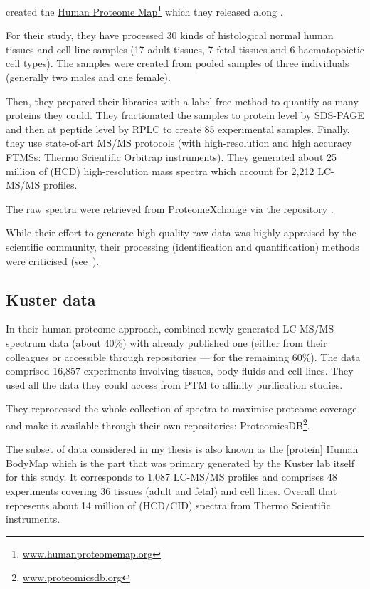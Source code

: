 \cite{PandeyData} created the \href{http://www.humanproteomemap.org/}%
{Human Proteome Map}\footnote{%
\href{http://www.humanproteomemap.org/}{www.humanproteomemap.org}} which
they released along .

For their study, they have processed 30 kinds of histological normal human
tissues and cell line samples (17 adult tissues, 7 fetal tissues and 6
haematopoietic cell types). The samples were created from pooled samples of three
individuals (generally two males and one female).

Then, they prepared their libraries with a label-free method to quantify
as many proteins they could. They fractionated the samples to protein level by
\gls{SDS-PAGE} and then at peptide level by \gls{RPLC} to create 85 experimental
samples. Finally, they use state-of-art \gls{MS/MS} protocols
(with high-resolution and high accuracy \glspl{FTMS}:
Thermo Scientific Orbitrap instruments).
They generated about 25 million of (\gls{HCD})
high-resolution mass spectra which account for 2,212 \gls{LC-MS/MS} profiles.

The raw spectra were retrieved from ProteomeXchange via the repository
.

While their effort to generate high quality raw data was highly appraised
by the scientific community, their processing
(identification and quantification) methods were
criticised (see~\cite{Ezkurdia2014-qx}).

\subsection{Kuster data}

In their human proteome approach,
\cite{KusterData} combined newly generated \gls{LC-MS/MS} spectrum
data (about 40\%) with already published one
(either from their colleagues or accessible through repositories ---
for the remaining 60\%).
The data comprised 16,857 experiments involving tissues, body fluids and cell
lines. They used all the data they could access from \gls{PTM} to affinity
purification studies.

They reprocessed the whole collection of spectra to maximise proteome coverage
and make it available through their own repositories: ProteomicsDB\footnote{%
\href{https://www.proteomicsdb.org/}{www.proteomicsdb.org}}.

The subset of data considered in my thesis is also
known as the [protein] Human BodyMap which is the part that was primary generated
by the Kuster lab itself for this study. It corresponds to 1,087 \gls{LC-MS/MS}
profiles and comprises 48 experiments covering 36 tissues (adult and fetal) and
cell lines. Overall that represents about 14 million of (\gls{HCD}/\gls{CID})
spectra from Thermo Scientific instruments.

